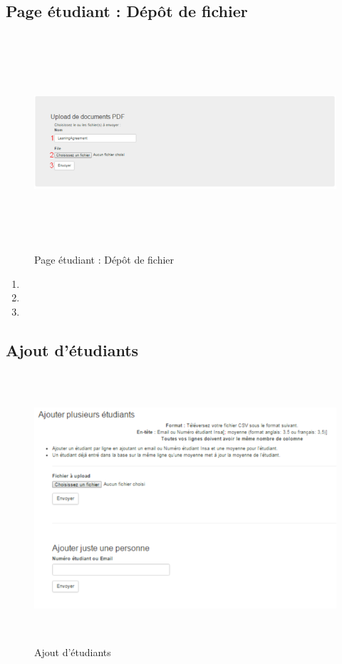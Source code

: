           \subsection{Page étudiant : Dépôt de fichier}
          \label{ef}
          \begin{figure}[H]
          	\centering
          	\includegraphics[width=12cm,height=8cm]{Images/Admin/ajout_fichier_admin.png}
          	\caption{Page étudiant : Dépôt de fichier}
          	
          \end{figure}
           \begin{enumerate}
           	\item
           	\item
           	\item
           \end{enumerate}
          
          \subsection{Ajout d'étudiants}
          \label{aet}
          \begin{figure}[H]
          	\centering
          	\includegraphics[width=14cm,height=10cm]{Images/Admin/ajout_etud_admin.png}
          	\caption{Ajout d'étudiants}
          	
          \end{figure}
        


